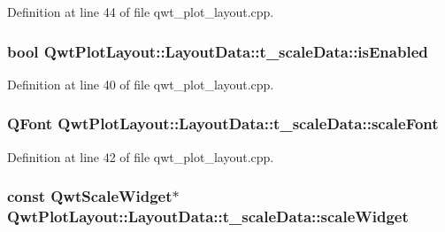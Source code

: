 Definition at line 44 of file qwt\-\_\-plot\-\_\-layout.\-cpp.

\hypertarget{struct_qwt_plot_layout_1_1_layout_data_1_1t__scale_data_acf8738d1152927c7ef3d167e04693632}{
\subsubsection[{is\-Enabled}]{\setlength{\rightskip}{0pt plus 5cm}bool Qwt\-Plot\-Layout\-::\-Layout\-Data\-::t\-\_\-scale\-Data\-::is\-Enabled}}\label{struct_qwt_plot_layout_1_1_layout_data_1_1t__scale_data_acf8738d1152927c7ef3d167e04693632}


Definition at line 40 of file qwt\-\_\-plot\-\_\-layout.\-cpp.

\hypertarget{struct_qwt_plot_layout_1_1_layout_data_1_1t__scale_data_af0f66230fb3f9d60b2251ebbef56919a}{
\subsubsection[{scale\-Font}]{\setlength{\rightskip}{0pt plus 5cm}Q\-Font Qwt\-Plot\-Layout\-::\-Layout\-Data\-::t\-\_\-scale\-Data\-::scale\-Font}}\label{struct_qwt_plot_layout_1_1_layout_data_1_1t__scale_data_af0f66230fb3f9d60b2251ebbef56919a}


Definition at line 42 of file qwt\-\_\-plot\-\_\-layout.\-cpp.

\hypertarget{struct_qwt_plot_layout_1_1_layout_data_1_1t__scale_data_a541cab444de6f42c9ac735c0099e87d1}{
\subsubsection[{scale\-Widget}]{\setlength{\rightskip}{0pt plus 5cm}const {\bf Qwt\-Scale\-Widget}$\ast$ Qwt\-Plot\-Layout\-::\-Layout\-Data\-::t\-\_\-scale\-Data\-::scale\-Widget}}\label{struct_qwt_plot_layout_1_1_layout_data_1_1t__scale_data_a541cab444de6f42c9ac735c0099e87d1}


